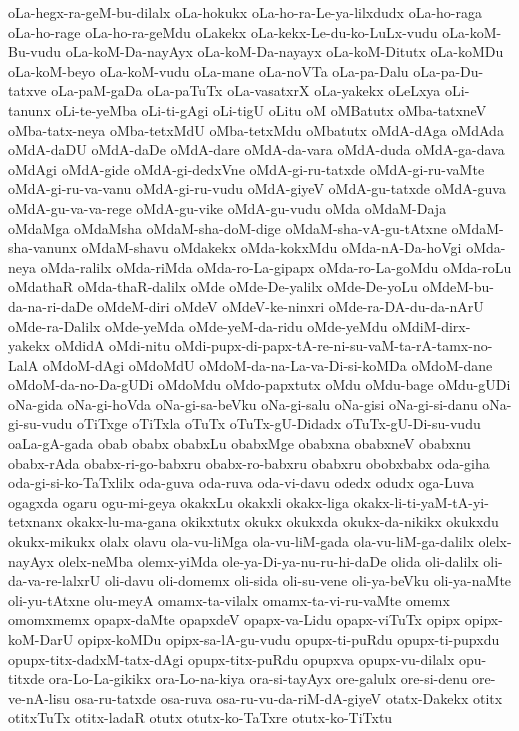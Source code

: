 {oLa-hegx-ra-geM-bu-dilalx
oLa-hokukx
oLa-ho-ra-Le-ya-lilxdudx
oLa-ho-raga
oLa-ho-rage
oLa-ho-ra-geMdu
oLakekx
oLa-kekx-Le-du-ko-LuLx-vudu
oLa-koM-Bu-vudu
oLa-koM-Da-nayAyx
oLa-koM-Da-nayayx
oLa-koM-Ditutx
oLa-koMDu
oLa-koM-beyo
oLa-koM-vudu
oLa-mane
oLa-noVTa
oLa-pa-Dalu
oLa-pa-Du-tatxve
oLa-paM-gaDa
oLa-paTuTx
oLa-vasatxrX
oLa-yakekx
oLeLxya
oLi-tanunx
oLi-te-yeMba
oLi-ti-gAgi
oLi-tigU
oLitu
oM
oMBatutx
oMba-tatxneV
oMba-tatx-neya
oMba-tetxMdU
oMba-tetxMdu
oMbatutx
oMdA-dAga
oMdAda
oMdA-daDU
oMdA-daDe
oMdA-dare
oMdA-da-vara
oMdA-duda
oMdA-ga-dava
oMdAgi
oMdA-gide
oMdA-gi-dedxVne
oMdA-gi-ru-tatxde
oMdA-gi-ru-vaMte
oMdA-gi-ru-va-vanu
oMdA-gi-ru-vudu
oMdA-giyeV
oMdA-gu-tatxde
oMdA-guva
oMdA-gu-va-va-rege
oMdA-gu-vike
oMdA-gu-vudu
oMda
oMdaM-Daja
oMdaMga
oMdaMsha
oMdaM-sha-doM-dige
oMdaM-sha-vA-gu-tAtxne
oMdaM-sha-vanunx
oMdaM-shavu
oMdakekx
oMda-kokxMdu
oMda-nA-Da-hoVgi
oMda-neya
oMda-ralilx
oMda-riMda
oMda-ro-La-gipapx
oMda-ro-La-goMdu
oMda-roLu
oMdathaR
oMda-thaR-dalilx
oMde
oMde-De-yalilx
oMde-De-yoLu
oMdeM-bu-da-na-ri-daDe
oMdeM-diri
oMdeV
oMdeV-ke-ninxri
oMde-ra-DA-du-da-nArU
oMde-ra-Dalilx
oMde-yeMda
oMde-yeM-da-ridu
oMde-yeMdu
oMdiM-dirx-yakekx
oMdidA
oMdi-nitu
oMdi-pupx-di-papx-tA-re-ni-su-vaM-ta-rA-tamx-no-LalA
oMdoM-dAgi
oMdoMdU
oMdoM-da-na-La-va-Di-si-koMDa
oMdoM-dane
oMdoM-da-no-Da-gUDi
oMdoMdu
oMdo-papxtutx
oMdu
oMdu-bage
oMdu-gUDi
oNa-gida
oNa-gi-hoVda
oNa-gi-sa-beVku
oNa-gi-salu
oNa-gisi
oNa-gi-si-danu
oNa-gi-su-vudu
oTiTxge
oTiTxla
oTuTx
oTuTx-gU-Didadx
oTuTx-gU-Di-su-vudu
oaLa-gA-gada
obab
obabx
obabxLu
obabxMge
obabxna
obabxneV
obabxnu
obabx-rAda
obabx-ri-go-babxru
obabx-ro-babxru
obabxru
obobxbabx
oda-giha
oda-gi-si-ko-TaTxlilx
oda-guva
oda-ruva
oda-vi-davu
odedx
odudx
oga-Luva
ogagxda
ogaru
ogu-mi-geya
okakxLu
okakxli
okakx-liga
okakx-li-ti-yaM-tA-yi-tetxnanx
okakx-lu-ma-gana
okikxtutx
okukx
okukxda
okukx-da-nikikx
okukxdu
okukx-mikukx
olalx
olavu
ola-vu-liMga
ola-vu-liM-gada
ola-vu-liM-ga-dalilx
olelx-nayAyx
olelx-neMba
olemx-yiMda
ole-ya-Di-ya-nu-ru-hi-daDe
olida
oli-dalilx
oli-da-va-re-lalxrU
oli-davu
oli-domemx
oli-sida
oli-su-vene
oli-ya-beVku
oli-ya-naMte
oli-yu-tAtxne
olu-meyA
omamx-ta-vilalx
omamx-ta-vi-ru-vaMte
omemx
omomxmemx
opapx-daMte
opapxdeV
opapx-va-Lidu
opapx-viTuTx
opipx
opipx-koM-DarU
opipx-koMDu
opipx-sa-lA-gu-vudu
opupx-ti-puRdu
opupx-ti-pupxdu
opupx-titx-dadxM-tatx-dAgi
opupx-titx-puRdu
opupxva
opupx-vu-dilalx
opu-titxde
ora-Lo-La-gikikx
ora-Lo-na-kiya
ora-si-tayAyx
ore-galulx
ore-si-denu
ore-ve-nA-lisu
osa-ru-tatxde
osa-ruva
osa-ru-vu-da-riM-dA-giyeV
otatx-Dakekx
otitx
otitxTuTx
otitx-ladaR
otutx
otutx-ko-TaTxre
otutx-ko-TiTxtu
}
